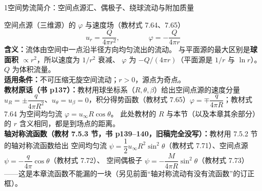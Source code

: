\begin{kaodian}{1}{空间势流简介：空间点源汇、偶极子、绕球流动与附加质量}
\begin{gongshi}{空间点源（三维源）的 $\varphi$ 与速度场（教材式 7.64、7.65）}
\[ u_r=\frac{Q}{4\pi r^2},\qquad\qquad \varphi=-\frac{Q}{4\pi r} \]
\textbf{含义：}流体由空间中一点沿半径方向均匀流出的流动。
与平面源的最大区别是\textbf{球面积 $\propto r^2$}，所以速度为 $1/r^2$ 衰减、
$\varphi$ 为 $-Q/(4\pi r)$（平面源是 $1/r$ 与 $\ln r$）。
$Q$ 为体积流量。\\
\textbf{适用条件：}不可压缩无旋空间流动；$r>0$，源点为奇点。\\
\textbf{教材原话（书 p137）：}教材用球坐标系（$R,\theta,\beta$）给出空间点源的速度分量 $u_R=\pm\dfrac{q}{4\pi R^2}$、$u_\theta=u_\beta=0$，积分得势函数（教材式 7.65）$\varphi=\mp\dfrac{q}{4\pi R}$；教材式 7.64 为空间均匀流 $\varphi=u_\infty R\cos\theta$。
此处教材的 $R$ 与本节（以及本章其余部分）的 $r$ 含义相同，都是到场点的距离。\\
\textbf{轴对称流函数（教材 7.5.3 节，书 p139--140，旧稿完全没写）：}教材用 7.5.2 节的轴对称流函数给出
空间均匀流 $\psi=\dfrac12 u_\infty R^2\sin^2\theta$（教材式 7.71）、空间点源 $\psi=-\dfrac{q}{4\pi}\cos\theta$（教材式 7.72）、
空间偶极子 $\psi=-\dfrac{M}{4\pi R}\sin^2\theta$（教材式 7.73）——这是本章流函数不能漏的一块（另见前面“轴对称流动有没有流函数”的订正框）。
\end{gongshi}


\end{kaodian}
